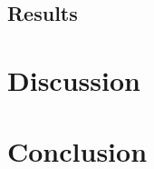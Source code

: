 \documentclass[twoside, parskip]{VRThesis} %
\begin{document}
\section{\label{sec::Results}Results}


\chapter{\label{chap::Discussion}Discussion}


\chapter{\label{chap::Conclusion}Conclusion}




%
\end{document}
